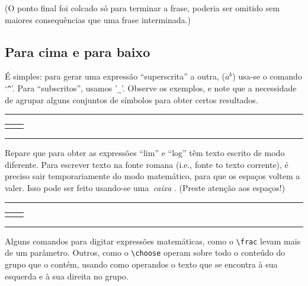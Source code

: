 (O ponto final foi colcado só para terminar a frase, poderia ser
omitido sem maiores consequências que uma frase interminada.)

\subsection[Índices e expoentes]{Para cima e para baixo}

É simples: para gerar uma expressão ``superscrita'' a outra, ($a^b$)
usa-se o comando `\verb'^''. Para ``subscritos'', usamos
'\verb'_''. Observe os exemplos, e note que a necessidade de agrupar
alguns conjuntos de símbolos para obter certos resultados.

\medskip
\begin{center}\hrule\smallskip\footnotesize
\begin{tabular}{c|c}
\begin{minipage}{.405\textwidth}\footnotesize

\end{minipage} &
\begin{minipage}{.535\textwidth}\setlength{\parindent}{1pc}

\end{minipage}
\end{tabular}
\smallskip\hrule
\end{center}
\medskip

Repare que para obter as expressões ``lim'' e ``log'' têm texto
escrito de modo diferente. Para  escrever texto na fonte romana
(i.e., fonte to texto corrente), é preciso sair temporariamente do
modo matemático, para que os espaços voltem a valer. Isso pode ser
feito usando-se uma~\emph{caixa}%
. (Preste atenção aos espaços!)

\medskip
\begin{center}\hrule\smallskip
\begin{tabular}{c|c}
\begin{minipage}{.405\textwidth}\footnotesize

\end{minipage} &
\begin{minipage}{.535\textwidth}\setlength{\parindent}{1pc}

\end{minipage}
\end{tabular}
\smallskip\hrule
\end{center}
\medskip

Alguns comandos para digitar expressões matemáticas, como o
\verb'\frac' levam mais de um parâmetro. Outros, como o \verb'\choose'
operam sobre todo o conteúdo do grupo que o contém, usando como
operandos o texto que se encontra à sua esquerda e à sua direita no
grupo.

